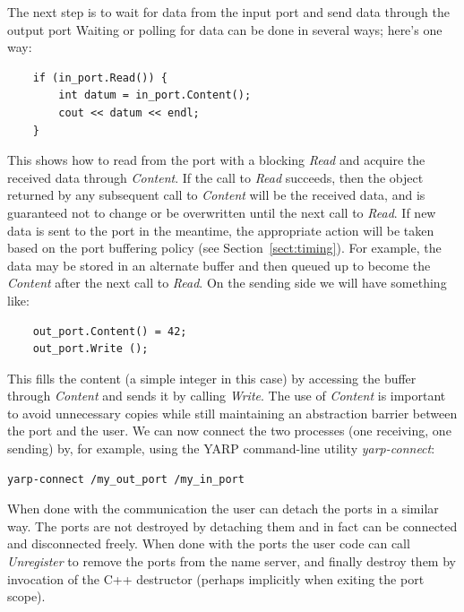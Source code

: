 The next step is to wait for data from the input port and send data through the output port
Waiting or polling for data can be done in several ways; here's one way:
%
\begin{verbatim}
    if (in_port.Read()) {
        int datum = in_port.Content();
        cout << datum << endl;
    }
\end{verbatim}
%
\noindent 
This shows how to read from the port with a blocking {\em Read} and
acquire the received data through {\em Content}. If the call to {\em
Read} succeeds, then the object returned by any subsequent call to
{\em Content} will be the received data, and is guaranteed not to
change or be overwritten until the next call to {\em Read}.
If new data is sent to the port in the meantime, the appropriate
action will be taken based on the port buffering policy (see Section~\ref{sect:timing}).  For example,
the data may be stored in an alternate buffer and then queued up to 
become the {\em Content} after the next call to {\em Read}.
%
On the sending side we will have something 
like:
%
\begin{verbatim}
    out_port.Content() = 42;
    out_port.Write ();
\end{verbatim}
%
\noindent This fills the content (a simple integer in this case) by
accessing the buffer through {\em Content} and sends it by calling
{\em Write}.  The use of {\em Content} is important to avoid unnecessary copies
while still maintaining an abstraction barrier between the port and the user.
%
%
We can now connect the two processes (one receiving,
one sending) by, for example, using the YARP command-line utility {\em yarp-connect}:

\begin{verbatim}
yarp-connect /my_out_port /my_in_port    
\end{verbatim}

\noindent 
%
When done with the communication the user can detach the ports in a similar way.
%
%
The ports are not destroyed by detaching them and in fact can be connected and disconnected
freely. When done with the ports the user code can call {\em Unregister} to 
remove the ports from the name server, and finally destroy them by invocation of the C++
destructor (perhaps implicitly when exiting the port scope).

